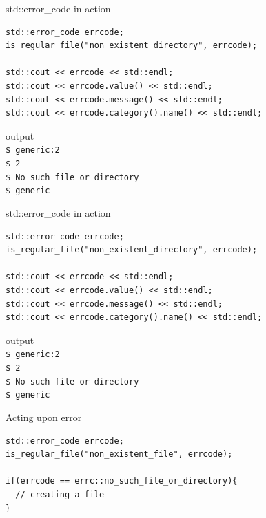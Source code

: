 \documentclass[10pt]{beamer}
\begin{document}
\begin{frame}[fragile]{std::error\_code in action}
	\begin{verbatim}
std::error_code errcode;
is_regular_file("non_existent_directory", errcode);

std::cout << errcode << std::endl;
std::cout << errcode.value() << std::endl;
std::cout << errcode.message() << std::endl;
std::cout << errcode.category().name() << std::endl;
	\end{verbatim}
	
	\hrulefill
	
	\begin{block}{output}
	\texttt{\\
		\$ generic:2 \\
		\$ 2 \\
		\$ \alert{No such file or directory} \\
		\$ generic}	
	\end{block}
	
\end{frame}

\begin{frame}[fragile]{std::error\_code in action}
	\begin{verbatim}
std::error_code errcode;
is_regular_file("non_existent_directory", errcode);

std::cout << errcode << std::endl;
std::cout << errcode.value() << std::endl;
std::cout << errcode.message() << std::endl;
std::cout << errcode.category().name() << std::endl;
	\end{verbatim}
	
	\hrulefill
	
	\begin{block}{output}
	\texttt{\\
		\$ generic:2 \\
		\$ 2 \\
		\$ No such file or directory \\
		\$ \alert{generic}}
	\end{block}
	
\end{frame}

\begin{frame}[fragile]{Acting upon error}
	\begin{verbatim}
std::error_code errcode;
is_regular_file("non_existent_file", errcode);
  
if(errcode == errc::no_such_file_or_directory){
  // creating a file
}
	\end{verbatim}
\end{frame}
\end{document}
